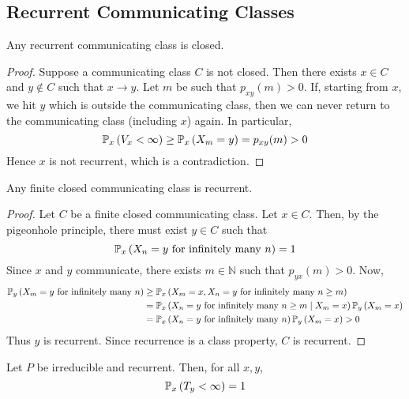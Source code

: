 \subsection{Recurrent Communicating Classes}
\begin{theorem}
	Any recurrent communicating class is closed.
\end{theorem}
\begin{proof}
	Suppose a communicating class \( C \) is not closed.
	Then there exists \( x \in C \) and \( y \not\in C \) such that \( x \to y \).
	Let \( m \) be such that \( p_{xy}(m) > 0 \).
	If, starting from \( x \), we hit \( y \) which is outside the communicating class, then we can never return to the communicating class (including \( x \)) again.
	In particular,
	\[
		\mathbb{P}_{x}\left({V_x < \infty}\right) \geq \mathbb{P}_{x}\left({X_m = y}\right) = p_{xy}(m) > 0
	\]
	Hence \( x \) is not recurrent, which is a contradiction.
\end{proof}
\begin{theorem}
	Any finite closed communicating class is recurrent.
\end{theorem}
\begin{proof}
	Let \( C \) be a finite closed communicating class.
	Let \( x \in C \).
	Then, by the pigeonhole principle, there must exist \( y \in C \) such that
	\[
		\mathbb{P}_{x}\left({X_n = y \text{ for infinitely many } n}\right) = 1
	\]
	Since \( x \) and \( y \) communicate, there exists \( m \in \mathbb N \) such that \( p_{yx}(m) > 0 \).
	Now,
	\begin{align*}
		\mathbb{P}_{y}\left({X_m = y \text{ for infinitely many } n}\right) & \geq \mathbb{P}_{x}\left({X_m = x, X_n = y \text{ for infinitely many } n \geq m}\right)                   \\
		                                                 & =\mathbb{P}_{x}\left({X_n = y \text{ for infinitely many } n \geq m \mid X_m = x}\right) \mathbb{P}_{y}\left({X_m = x}\right) \\
		                                                 & =\mathbb{P}_{x}\left({X_n = y \text{ for infinitely many } n}\right) \mathbb{P}_{y}\left({X_m = x}\right) > 0
	\end{align*}
	Thus \( y \) is recurrent.
	Since recurrence is a class property, \( C \) is recurrent.
\end{proof}
\begin{theorem}
	Let \( P \) be irreducible and recurrent.
	Then, for all \( x, y \),
	\[
		\mathbb{P}_{x}\left({T_y < \infty}\right) = 1
	\]
\end{theorem}
